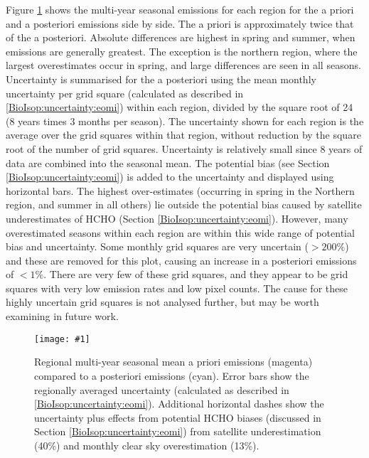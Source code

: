 \documentclass[acp, manuscript]{copernicus}
\newcommand{\mypic}[3]{%
  \begin{figure}
    \texttt{[image: \#1]}
    \caption{#2}
    #3
  \end{figure}
}
\begin{document}
    
    Figure \ref{BioIsop:results:emissions:fig_regional_seasonal_comparison} shows the multi-year seasonal emissions for each region for the a priori and a posteriori emissions side by side.
    The a priori is approximately twice that of the a posteriori.
    Absolute differences are highest in spring and summer, when emissions are generally greatest.
    The exception is the northern region, where the largest overestimates occur in spring, and large differences are seen in all seasons.
    Uncertainty is summarised for the a posteriori using the mean monthly uncertainty per grid square (calculated as described in \ref{BioIsop:uncertainty:eomi}) within each region, divided by the square root of 24 (8 years times 3 months per season).
    The uncertainty shown for each region is the average over the grid squares within that region, without reduction by the square root of the number of grid squares.
    Uncertainty is relatively small since 8 years of data are combined into the seasonal mean.
    The potential bias (see Section \ref{BioIsop:uncertainty:eomi}) is added to the uncertainty and displayed using horizontal bars.
    The highest over-estimates (occurring in spring in the Northern region, and summer in all others) lie outside the potential bias caused by satellite underestimates of HCHO (Section \ref{BioIsop:uncertainty:eomi}).
    However, many overestimated seasons within each region are within this wide range of potential bias and uncertainty.
    Some monthly grid squares are very uncertain ($>200\%$) and these are removed for this plot, causing an increase in a posteriori emissions of $<1\%$.
    There are very few of these grid squares, and they appear to be grid squares with very low emission rates and low pixel counts.
    The cause for these highly uncertain grid squares is not analysed further, but may be worth examining in future work.
    
    \mypic{Figures/Emiss/E_zones_diffs.png}{%
      Regional multi-year seasonal mean a priori emissions (magenta) compared to a posteriori emissions (cyan).
      Error bars show the regionally averaged uncertainty (calculated as described in \ref{BioIsop:uncertainty:eomi}).
      Additional horizontal dashes show the uncertainty plus effects from potential HCHO biases (discussed in Section \ref{BioIsop:uncertainty:eomi}) from satellite underestimation (40\%) and monthly clear sky overestimation (13\%).
    }{\label{BioIsop:results:emissions:fig_regional_seasonal_comparison}}
    
\end{document}
